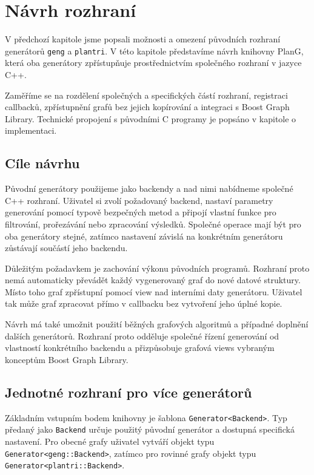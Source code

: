 \chapter{Návrh rozhraní}
\label{chap:design}

V předchozí kapitole jsme popsali možnosti a omezení původních rozhraní
generátorů \texttt{geng} a \texttt{plantri}. V této kapitole představíme návrh
knihovny PlanG, která oba generátory zpřístupňuje prostřednictvím společného
rozhraní v jazyce C++.

Zaměříme se na rozdělení společných a specifických částí rozhraní, registraci
callbacků, zpřístupnění grafů bez jejich kopírování a integraci s Boost Graph
Library. Technické propojení s původními C programy je popsáno v kapitole
o implementaci.

\section{Cíle návrhu}
\label{sec:design-goals}

Původní generátory použijeme jako backendy a nad nimi nabídneme společné C++
rozhraní. Uživatel si zvolí požadovaný backend, nastaví parametry generování pomocí
typově bezpečných metod a připojí vlastní funkce pro filtrování, prořezávání
nebo zpracování výsledků. Společné operace mají být pro oba generátory stejné,
zatímco nastavení závislá na konkrétním generátoru zůstávají součástí jeho
backendu.

Důležitým požadavkem je zachování výkonu původních programů. Rozhraní proto
nemá automaticky převádět každý vygenerovaný graf do nové datové struktury.
Místo toho graf zpřístupní pomocí view nad interními daty generátoru. Uživatel
tak může graf zpracovat přímo v callbacku bez vytvoření jeho úplné kopie.

Návrh má také umožnit použití běžných grafových algoritmů a případné doplnění
dalších generátorů. Rozhraní proto odděluje společné řízení generování od
vlastností konkrétního backendu a přizpůsobuje grafová views vybraným
konceptům Boost Graph Library.

\section{Jednotné rozhraní pro více generátorů}
\label{sec:unified-interface}


Základním vstupním bodem knihovny je šablona
\texttt{Generator\textless Backend\textgreater}. Typ předaný jako
\texttt{Backend} určuje použitý původní generátor a dostupná specifická
nastavení. Pro obecné grafy uživatel vytváří objekt typu
\texttt{Generator\textless geng::Backend\textgreater}, zatímco pro rovinné
grafy objekt typu \texttt{Generator\textless plantri::Backend\textgreater}.

